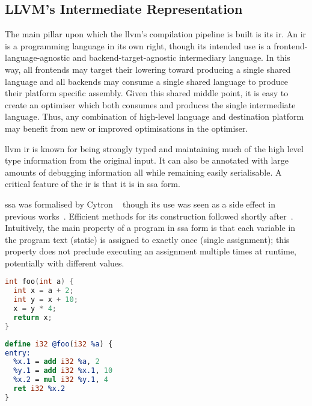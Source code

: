 \documentclass[\main/thesis.tex]{subfiles}
\begin{document}
\subsection{LLVM's Intermediate Representation}
\label{sec:ir}
The main pillar upon which the \gls{llvm}'s compilation pipeline is built is its \gls{ir}.
An \gls{ir} is a programming language in its own right, though its intended use is a frontend-language-agnostic and backend-target-agnostic intermediary language.
In this way, all frontends may target their \gls{lowering} toward producing a single shared language and all backends may consume a single shared language to produce their platform specific assembly.
Given this shared middle point, it is easy to create an optimiser which both consumes and produces the single intermediate language.
Thus, any combination of high-level language and destination platform may benefit from new or improved optimisations in the optimiser.

\Gls{llvm} \gls{ir} is known for being strongly typed and maintaining much of the high level type information from the original input.
It can also be annotated with large amounts of debugging information all while remaining easily serialisable.
A critical feature of the \gls{ir} is that it is in \gls{ssa} form.

\Gls{ssa} was formalised by Cytron \etal~\autocite{cytron1989efficient} though its use was seen as a side effect in previous works~\autocite{rosen1988global,alpern1988detecting}.
Efficient methods for its construction followed shortly after~\autocite{cytron1991efficiently,brandis1994single}.
Intuitively, the main property of a program in \gls{ssa} form is that each variable in the program text (static) is assigned to exactly once (single assignment); this property does not preclude executing an assignment multiple times at runtime, potentially with different values.

\noindent
\begin{minipage}[t]{0.45\linewidth}
\centering
\begin{lstlisting}[caption={[Example C program, pre-SSA conversion.]An simple example C program, pre-conversion to \gls{ssa}.},
      label=lst:cSSA,numbers=none,language=c,columns=flexible]
int foo(int a) {
  int x = a + 2;
  int y = x + 10;
  x = y * 4;
  return x;
}
\end{lstlisting}
\end{minipage}
\hspace{.025\linewidth}
\noindent
\begin{minipage}[t]{0.45\linewidth}
\centering
\begin{lstlisting}[caption={[Example LLVM IR program, post-SSA conversion.]The same simple program, converted to \gls{llvm} \gls{ir} in \gls{ssa} format.},
      label=lst:llSSA,numbers=none,language=llvm,columns=flexible]
define i32 @foo(i32 %a) {
entry:
  %x.1 = add i32 %a, 2
  %y.1 = add i32 %x.1, 10
  %x.2 = mul i32 %y.1, 4
  ret i32 %x.2
}
\end{lstlisting}
\end{minipage}
\end{document}
